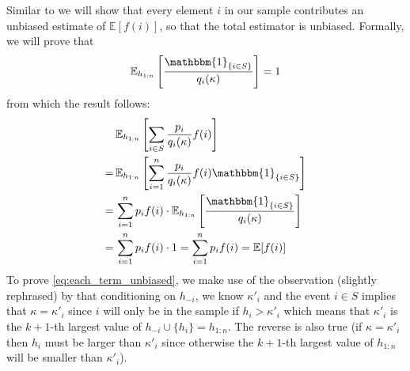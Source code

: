 Similar to \citet{duffield2007priority} we will show that every element $i$ in our sample contributes an unbiased estimate of $\mathbb{E}[f(i)]$, so that the total estimator is unbiased. Formally, we will prove that
\begin{equation}
\label{eq:each_term_unbiased}
    \mathbb{E}_{h_{1:n}}\left[\frac{\mathbbm{1}_{\{i \in S\}}}{q_i(\kappa)}\right] = 1
\end{equation}
from which the result follows:
\begin{align*}
    & \, \mathbb{E}_{h_{1:n}} \left[ \sum_{i \in S} \frac{p_i}{q_i(\kappa)} f(i) \right] \\
    = & \, \mathbb{E}_{h_{1:n}} \left[ \sum_{i=1}^n \frac{p_i}{q_i(\kappa)} f(i) \mathbbm{1}_{\{i \in S\}} \right] \\
    = & \, \sum_{i=1}^n p_i f(i) \cdot \mathbb{E}_{h_{1:n}} \left[ \frac{\mathbbm{1}_{\{i \in S\}}}{q_i(\kappa)} \right] \\
    = & \, \sum_{i=1}^n p_i f(i) \cdot 1 = \sum_{i=1}^n p_i f(i) = \mathbb{E}[f(i)]
\end{align*}
To prove \eqref{eq:each_term_unbiased}, we make use of the observation (slightly rephrased) by \citet{duffield2007priority} that conditioning on $h_{-i}$, we know $\kappa'_i$ and the event $i \in S$ implies that $\kappa = \kappa'_i$ since $i$ will only be in the sample if $h_i > \kappa'_i$ which means that $\kappa'_i$ is the $k+1$-th largest value of $h_{-i} \cup \{h_i\} = h_{1:n}$. The reverse is also true (if $\kappa = \kappa'_i$ then $h_i$ must be larger than $\kappa'_i$ since otherwise the $k+1$-th largest value of $h_{1:n}$ will be smaller than $\kappa'_i$).
